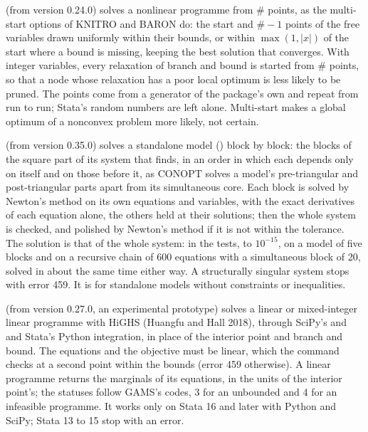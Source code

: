 \begin{optdesc}
\item[\optarg{}{starts}{\#}] (from version 0.24.0) solves a nonlinear
programme from \# points, as the multi-start options of KNITRO and BARON
do: the start and $\# - 1$ points of the free variables drawn uniformly
within their bounds, or within $\max(1, |x|)$ of the start where a bound is
missing, keeping the best solution that converges. With integer variables,
every relaxation of branch and bound is started from \# points, so that a
node whose relaxation has a poor local optimum is less likely to be pruned.
The points come from a generator of the package's own and repeat from run
to run; Stata's random numbers are left alone. Multi-start makes a global
optimum of a nonconvex problem more likely, not certain.

\item[\opt{block}{s}] (from version 0.35.0) solves a standalone model
() block by block: the blocks of the square part of its
system that  finds, in an order in which each depends
only on itself and on those before it, as CONOPT solves a model's
pre-triangular and post-triangular parts apart from its simultaneous core.
Each block is solved by Newton's method on its own equations and variables,
with the exact derivatives of each equation alone, the others held at their
solutions; then the whole system is checked, and polished by Newton's method
if it is not within the tolerance. The solution is that of the whole system:
in the tests, to $10^{-15}$, on a model of five blocks and on a recursive
chain of 600 equations with a simultaneous block of 20, solved in about the
same time either way. A structurally singular system stops with error 459.
It is for standalone models without constraints or inequalities.

\item[\optarg{sol}{ver}{highs}] (from version 0.27.0, an experimental
prototype) solves a linear or mixed-integer linear programme with HiGHS
(Huangfu and Hall 2018), through SciPy's  and  and
Stata's Python integration, in place of the interior point and branch and
bound. The equations and the objective must be linear, which the command
checks at a second point within the bounds (error 459 otherwise). A linear
programme returns the marginals of its equations, in the units of the
interior point's; the statuses follow GAMS's codes, 3 for an unbounded and 4
for an infeasible programme. It works only on Stata 16 and later with Python
and SciPy; Stata 13 to 15 stop with an error.


\end{optdesc}
